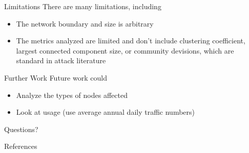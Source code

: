 \documentclass{beamer}
\numberwithin{figure}{section} %
\numberwithin{table}{section} %
\begin{document}
\begin{frame}{Limitations}
    There are many limitations, including
    \begin{itemize}
        \item The network boundary and size is arbitrary
        \item The metrics analyzed are limited and don't include clustering coefficient, largest connected component size, or community devisions, which are standard in attack literature {\tiny \parencite{Xeumei10}}
    \end{itemize}
\end{frame}

\begin{frame}{Further Work}
    Future work could
    \begin{itemize}
        \item Analyze the types of nodes affected 
        \item Look at usage (use average annual daily traffic numbers)
    \end{itemize}
\end{frame}

\begin{frame}[standout]
    Questions?
\end{frame}


\appendix

\begin{frame}[allowframebreaks]{References}
    \printbibliography[heading=none]
\end{frame}
\end{document}
